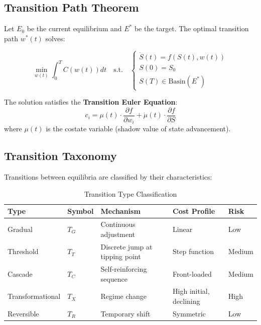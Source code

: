 \subsection{Transition Path Theorem}

\begin{theorem}
\label{thm:meq-transition}

Let $E_0$ be the current equilibrium and $E^*$ be the target. The optimal
transition path $w^*(t)$ solves:

\begin{equation}
\boxed{
\min_{w(t)} \int_0^T C(w(t)) dt \quad \text{s.t.} \quad
\begin{cases}
\dot{S}(t) = f(S(t), w(t)) \\
S(0) = S_0 \\
S(T) \in \text{Basin}(E^*)
\end{cases}
}
\end{equation}

The solution satisfies the \textbf{Transition Euler Equation}:
\begin{equation}
c_i = \mu(t) \cdot \frac{\partial f}{\partial w_i} + \dot{\mu}(t) \cdot \frac{\partial f}{\partial S}
\end{equation}
where $\mu(t)$ is the costate variable (shadow value of state advancement).
\end{theorem}

\subsection{Transition Taxonomy}

\begin{definition}
Transitions between equilibria are classified by their characteristics:

\begin{table}[H]
\centering
\caption{Transition Type Classification}
\label{tab:meq-transitions}
\renewcommand{\arraystretch}{1.4}
\begin{tabular}{@{}lllll@{}}
\toprule
\textbf{Type} & \textbf{Symbol} & \textbf{Mechanism} & \textbf{Cost Profile} & \textbf{Risk} \\
\midrule
Gradual & $T_G$ & Continuous adjustment & Linear & Low \\
Threshold & $T_T$ & Discrete jump at tipping point & Step function & Medium \\
Cascade & $T_C$ & Self-reinforcing sequence & Front-loaded & Medium \\
Transformational & $T_X$ & Regime change & High initial, declining & High \\
Reversible & $T_R$ & Temporary shift & Symmetric & Low \\
\bottomrule
\end{tabular}
\end{table}
\end{definition}

